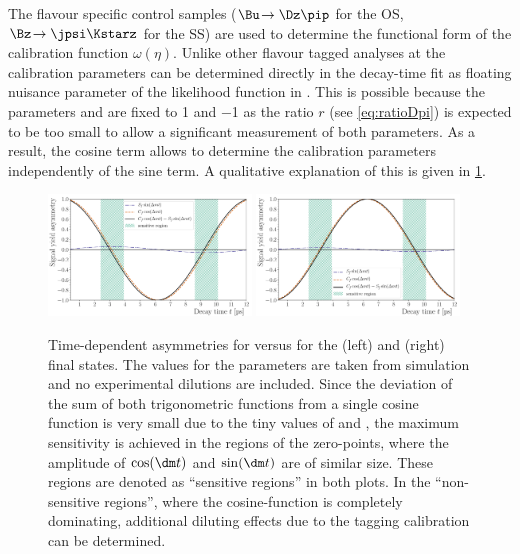 The flavour specific control samples ($\Bu\!\to\Dz\pip$ for the OS, $\Bz\!\to\jpsi\Kstarz$ for the SS) are used to determine the functional form of the calibration function $\omega(\eta)$.
Unlike other flavour tagged analyses at \lhcb the calibration parameters can be determined directly in the decay-time fit as floating nuisance parameter of the likelihood function in \BdToDpi.
This is possible because the parameters \Cf and \Cfbar are fixed to \num{1} and \num{-1} as the ratio $r$ (see \cref{eq:ratioDpi}) is expected to be too small to allow a significant measurement of both parameters.
As a result, the cosine term allows to determine the calibration parameters independently of the sine term.
A qualitative explanation of this is given in \cref{fig:FTstrategy}.
\begin{figure}[tbp]
    \centering
    \includegraphics[width=0.48\textwidth]{08FlavourTagging/figs/oscillation_f.pdf}
    \includegraphics[width=0.48\textwidth]{08FlavourTagging/figs/oscillation_fbar.pdf}
    \caption{Time-dependent asymmetries for \Bzb versus \Bz for the \Dm\pip (left) and \Dp\pim (right) final states.
    The values for the \CP parameters are taken from simulation and no experimental dilutions are included.
    Since the deviation of the sum of both trigonometric functions from a single cosine function is very small due to the tiny values of \Sf and \Sfbar, the maximum sensitivity is achieved in the regions of the zero-points, \ie where the amplitude of $\cos(\dm t)$ and $\sin(\dm t)$ are of similar size.
    These regions are denoted as \enquote{sensitive regions} in both plots.
    In the \enquote{non-sensitive regions}, where the cosine-function is completely dominating, additional diluting effects due to the tagging calibration can be determined.}
    \label{fig:FTstrategy}
\end{figure}

